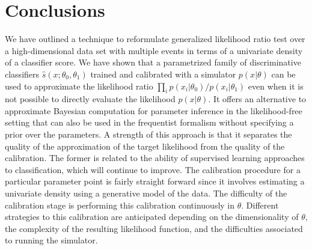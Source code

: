 \documentclass[12pt]{article}
\numberwithin{equation}{section}
\theoremstyle{plain}
\begin{document}
\section{Conclusions}

We have outlined a technique to reformulate generalized likelihood ratio test
over a high-dimensional data set with multiple events in terms of a univariate
density of a classifier score. We have shown that a parametrized family of
discriminative classifiers $\hat s(x; \theta_0, \theta_1)$ trained and
calibrated with a simulator  $p(x|\theta)$ can be used to approximate the
likelihood ratio  $\prod_i p(x_i|\theta_0)/p(x_i|\theta_1)$ even when it is not
possible to directly evaluate the likelihood $p(x|\theta)$.
It offers an alternative to approximate Bayesian computation for parameter
inference in the likelihood-free setting that can also be used in the
frequentist formalism without specifying a prior over the parameters. A strength
of this approach is that it separates the quality of the approximation of the
target likelihood from the quality of the calibration. The former is related to
the ability of supervised learning approaches to  classification, which will
continue to improve. The calibration procedure for a particular parameter point
is fairly straight forward since it involves estimating a univariate density
using a generative model of the data. The difficulty of the calibration stage is
performing this calibration continuously in $\theta$. Different strategies to
this calibration are anticipated depending on the dimensionality of $\theta$,
the complexity of the resulting likelihood function, and the difficulties
associated to running the simulator.



\end{document}
